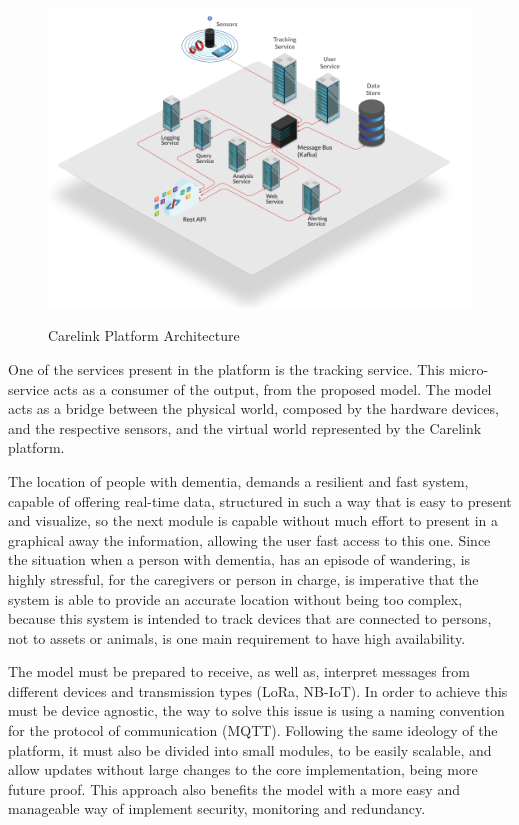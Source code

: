 \begin{figure}[htbp]
  \centering
  
    {\includegraphics[width=1\linewidth]{Chapters/Figures/Carelink-Diagrams-1024x724.png}}%
 
  \caption{Carelink Platform Architecture~\cite{carelink}}
  \label{fig:Platform_Archictecture}
\end{figure}
One of the services present in the platform is the tracking service. This micro-service acts as a consumer of the output, from the proposed model. 
The model acts as a bridge between the physical world, composed by the hardware devices, and the respective sensors, and the virtual world represented by the Carelink platform.

The location of people with dementia, demands a resilient and fast system, capable of offering real-time data, structured in such a way that is easy to present and visualize, so the next module is capable without much effort to present in a graphical away the information, allowing the user fast access to this one.
Since the situation when a person with dementia, has an episode of wandering, is highly stressful, for the caregivers or person in charge, is imperative that the system is able to provide an accurate location without being too complex, because this system is intended to track devices that are connected to persons, not to assets or animals, is one main requirement to have high availability.\newline\newline


The model must be prepared to receive, as well as, interpret messages from different devices and transmission types (LoRa, NB-IoT). In order to achieve this must be device agnostic, the way to solve this issue is using a naming convention for the protocol of communication (MQTT). 
Following the same ideology of the platform, it must also be divided into small modules, to be easily scalable, and allow updates without large changes to the core implementation, being more future proof. This approach also benefits the model with a more easy and manageable way of implement security, monitoring and redundancy.

